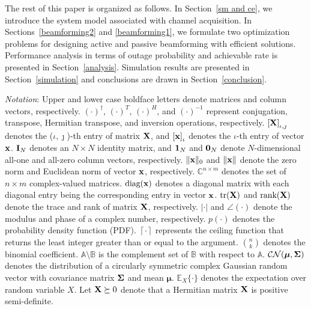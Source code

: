 \documentclass[draftclsnofoot,onecolumn,12pt]{IEEEtran}
\newcommand{\revh}[1]{{\color{black}#1}} %
\newcommand{\revh}[1]{#1}
\begin{document}
The rest of this paper is organized as follows. In Section~\ref{sm and ce}, we introduce the system model associated with channel acquisition. In Sections~\ref{beamforming2} and \ref{beamforming1}, we formulate two optimization problems for designing active and passive beamforming with efficient solutions. 
Performance analysis in terms of outage probability and achievable rate is presented in Section~\ref{analysis}. 
Simulation results are presented in Section~\ref{simulation} and conclusions are drawn in Section~\ref{conclusion}.

\emph{Notation}: Upper and lower case boldface letters denote matrices and column vectors, respectively.  
${\left(\cdot\right)}^\dagger$,  ${\left(\cdot\right)}^T$, ${\left(\cdot\right)}^H$, and ${\left(\cdot\right)}^{-1}$ represent conjugation,  transpose, Hermitian transpose, and inversion operations, respectively. 
$\left[\bf X\right]_{\iota,\jmath}$ denotes the ($\iota,\jmath$)-th entry of matrix $\bf X$, and $\left[\bf x\right]_{\iota}$ denotes the $\iota$-th entry of vector $\bf x$. 
${\bf I}_N$ denotes an $N\times N$ identity matrix, \revh{and ${\bf 1}_{N}$ and ${\bf 0}_{N}$ denote $N$-dimensional all-one and all-zero column vectors, respectively.} 
$\lVert{\bf x}\rVert_0$ and $\lVert{\bf x}\rVert$ denote the zero norm and Euclidean norm of vector $\bf x$, respectively. 
$\mathbb{C}^{n\times m}$ denotes the set of $n\times m$ complex-valued matrices. 
$\text{diag}(\bf x)$ denotes a diagonal matrix with each diagonal entry being the corresponding entry in vector $\bf x$. 
$\text{tr}({\bf X})$ and $\text{rank}({\bf X})$ denote the trace and rank of matrix $\bf X$, respectively. 
$|\cdot|$ and \revh{$\angle(\cdot)$} denote the modulus and phase of a complex number, respectively.  
$p\left(\cdot\right)$ denotes the probability density function (PDF).
$\left\lceil\cdot\right\rceil$ represents the ceiling function that returns the least integer greater than or equal to the argument. 
${n\choose{k}}$ denotes the binomial coefficient. 
$\mathbb{A}\setminus \mathbb{B}$ is the complement set of $\mathbb{B}$ with respect to $\mathbb{A}$. 
$\mathcal{CN}( {\bm \mu},{\bf \Sigma})$ denotes the distribution
of a circularly symmetric complex Gaussian random vector with covariance matrix $\bf \Sigma$ and mean $\bm \mu$. 
$\mathbb{E}_X\{\cdot\}$ denotes the expectation over random variable $X$. Let ${\bf X}\succeq 0 $ denote that a Hermitian matrix $\bf X$ is positive semi-definite. 
\end{document}
